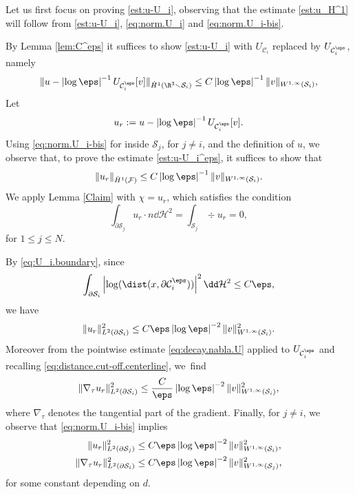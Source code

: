 Let us first focus on proving
\eqref{est:u-U_i}, observing that the estimate \eqref{est:u_H^1} will follow from \eqref{est:u-U_i}, \eqref{eq:norm.U_i} and \eqref{eq:norm.U_i-bis}.

By Lemma \ref{lem:C^eps} it suffices to show \eqref{est:u-U_i} with $ U_{\mathcal C_i}$ replaced by $ U_{\mathcal C_i^\eps}$, namely
\begin{equation} \label{est:u-U_i^eps}
\|u - \left|\log \eps\right|^{-1} U_{\mathcal C_i^\eps}[v]\|_{\dot H^1(\R^3 \smallsetminus \mathcal S_i)}
\leq C \left|\log \eps\right|^{-1} \|v\|_{W^{1,\infty} (\mathcal S_i)},
\end{equation}
Let
\[
u_r := u - \left|\log \eps\right|^{-1} U_{{\mathcal C}_{i}^\eps} [v].\]
Using \eqref{eq:norm.U_i-bis} for inside $\mathcal S_j$, for $j\neq i$, and the definition of $u$, we observe that, to prove the estimate \eqref{est:u-U_i^eps},
it suffices to show that
\begin{equation}
\|u_r \|_{\dot H^1(\mathcal F)} \leq C \left|\log \eps\right|^{-1} \|v\|_{W^{1,\infty}{(\mathcal S_i)}}.
\end{equation}
We apply Lemma \ref{Claim} with $\chi=u_r$, which satisfies the condition
\begin{equation}
\int_{\partial\mathcal S_j} u_r \cdot n \dd \mathcal{H}^2 = \int_{\mathcal S_j} \div u_r = 0,
\end{equation}
for $1 \leq j \leq N$.

By \eqref{eq:U_i.boundary}, since
\[
\int_{\partial\mathcal S_i} \left|\log(\dist(x,\partial \mathcal C_i^\eps))\right|^2 \dd \mathcal H^2 \leq C \eps, \]
we have
\begin{equation}
\| u_r \|^2_{L^2(\partial \mathcal S_i)} \leq
C \eps \left|\log \eps\right|^{-2}\|v\|_{W^{1,\infty}{(\mathcal S_i)}}^2.
\end{equation}
Moreover from the pointwise estimate \eqref{eq:decay.nabla.U} applied to $U_{\mathcal C_i^\eps}$ and recalling \eqref{eq:distance.cut-off.centerline}, we~find%
\begin{equation}
\|\nabla_\tau u_r\|^2_{L^2(\partial \mathcal S_i)} \leq
\frac C \eps \left|\log \eps\right|^{-2}\|v\|_{W^{1,\infty}{(\mathcal S_i)}}^2,
\end{equation}
where $\nabla_\tau$ denotes the tangential part of the gradient.
Finally, for $j \neq i$, we observe that \eqref{eq:norm.U_i-bis} implies
\begin{align}
\| u_r \|^2_{L^2(\partial \mathcal S_j)} &\leq
C \eps \left|\log \eps\right|^{-2}\|v\|_{W^{1,\infty}{(\mathcal S_i)}}^2, \\
\|\nabla_\tau u_r\|^2_{L^2(\partial \mathcal S_i)} &\leq
C \eps \left|\log \eps\right|^{-2}\|v\|_{W^{1,\infty}{(\mathcal S_j)}}^2,
\end{align}
for some constant depending on $d$.


